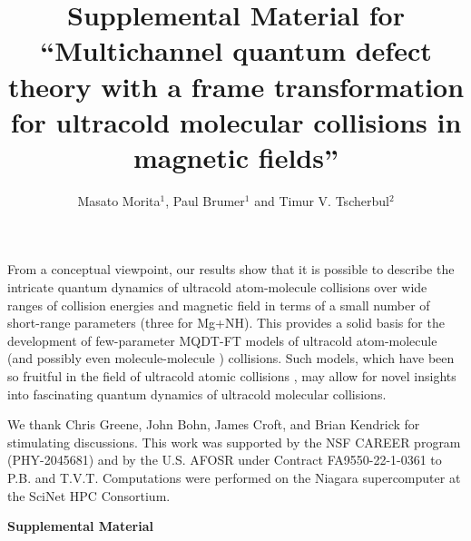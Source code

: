 \documentclass[reprint,amssymb,noeprint,twocolumn,longbibliography]{revtex4-2}
\begin{document}
From a conceptual viewpoint, our results show that it is possible to describe the intricate quantum dynamics of ultracold atom-molecule collisions over wide ranges of collision energies and magnetic field in terms of a small number of short-range parameters (three for Mg+NH). This provides a solid basis for the development of few-parameter MQDT-FT models of ultracold atom-molecule (and possibly even molecule-molecule \cite{Park_23}) collisions. Such models, which have been so fruitful in the field of ultracold atomic collisions \cite{Burke_99,Gao_05}, may allow for novel insights into fascinating quantum dynamics of ultracold molecular collisions. 



We thank Chris Greene, John Bohn, James Croft, and Brian Kendrick for stimulating discussions. 
This work was supported by the NSF CAREER program (PHY-2045681) and by the U.S. AFOSR under Contract FA9550-22-1-0361 to P.B. and T.V.T.
Computations were performed on the Niagara supercomputer at the SciNet HPC Consortium.

\newpage

\widetext
\begin{center}
\textbf{\large Supplemental Material}


\end{center}
\setcounter{equation}{0}
\setcounter{figure}{0}
\setcounter{table}{0}


\title{ \bf{Supplemental Material for \\  ``Multichannel quantum defect theory with a frame transformation \\ for ultracold molecular collisions in magnetic fields''}}

\author{ Masato Morita$^{1}$, Paul Brumer$^{1}$ and Timur V. Tscherbul$^{2}$ \\ }

\vspace{0.5cm}
\end{document}
